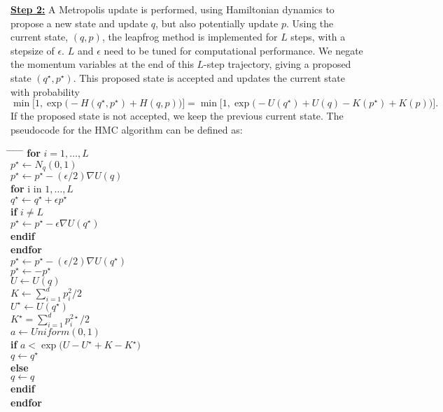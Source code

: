 \documentclass[twoside]{article}
\begin{document}
\underline{\textbf{Step 2:}} A Metropolis update is performed, using Hamiltonian dynamics to propose a new state and update $q$, but also potentially update $p$. Using the current state, $(q,p)$, the leapfrog method is implemented for $L$ steps, with a stepsize of $\epsilon$. $L$ and $\epsilon$ need to be tuned for computational performance. We negate the momentum variables at the end of this $L$-step trajectory, giving a proposed state $(q^{\star},p^{\star})$. This proposed state is accepted and updates the current state with probability
$$\min \Big[1,\exp \big(-H(q^{\star},p^{\star}) + H(q,p)\big)\Big] = \min \Big[1,\exp \big(-U(q^{\star}) + U(q) - K(p^{\star}) + K(p)\big) \Big].$$
If the proposed state is not accepted, we keep the previous current state. The pseudocode for the HMC algorithm can be defined as:
\begin{tabbing}
\hspace*{.25in} \= \hspace*{.25in} \= \hspace*{.25in} \= \hspace*{.25in} \= \hspace*{.25in} \=\kill
\> \textbf{for} $i =1,\ldots,L$ \\
\>\> $p^{\star} \leftarrow N_q(0, 1)$ \\
\>\> $p^{\star} \leftarrow p^{\star} - (\epsilon/2)\nabla U(q)$\\
\>\> \textbf{for} i in $1,\ldots,L$ \\
\>\>\> $q^{\star} \leftarrow q^{\star} + \epsilon p^{\star}$ \\
\>\>\> \textbf{if} $i \neq L$ \\
\>\>\>\> $p^{\star} \leftarrow p^{\star} - \epsilon \nabla U(q^{\star})$ \\
\>\>\> \textbf{endif} \\
\>\> \textbf{endfor} \\
\>\> $p^{\star} \leftarrow p^{\star} - (\epsilon/2) \nabla U(q^{\star})$ \\
\>\> $p^{\star} \leftarrow -p^{\star}$ \\
\>\> $U \leftarrow U(q)$ \\
\>\> $K \leftarrow \sum_{i=1}^d p_i^2/2$ \\
\>\> $U^{\star} \leftarrow U(q^{\star})$ \\
\>\> $K^{\star} = \sum_{i=1}^d p^{2\star}_i/2$ \\
\>\> $a \leftarrow Uniform(0,1)$ \\
\>\> \textbf{if} $a < \exp\big(U - U^{\star} + K - K^{\star}\big)$ \\
\>\>\> $q \leftarrow q^{\star}$\\
\>\> \textbf{else} \\
\>\>\> $q \leftarrow q$ \\
\>\> \textbf{endif} \\
\> \textbf{endfor}
\end{tabbing}




\end{document}
